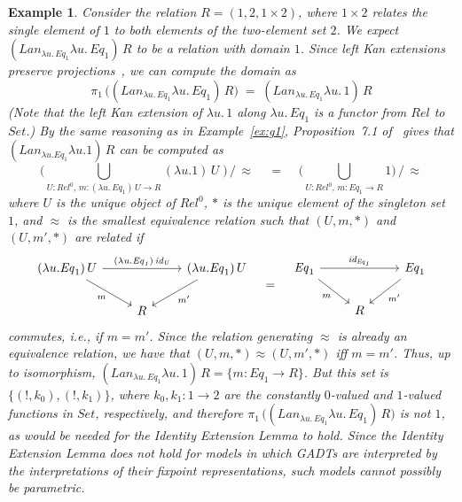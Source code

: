 \documentclass[submission,copyright,creativecommons]{eptcs}
\newtheorem{example}[thm]{Example}
\begin{document}
\begin{example}
Consider the relation $R = (1, 2, 1 \times 2)$, where $1 \times 2$
relates the single element of $1$ to both elements of the two-element
set $2$. We expect $(\mathit{Lan}_{\lambda u\!.\,\mathit{Eq}_1}
\lambda u\!.\,\mathit{Eq}_1)\, R$ to be a relation with domain
$1$. Since left Kan extensions preserve projections~\cite{rie16}, we
can compute the domain as
\[\pi_1\,\big( (\mathit{Lan}_{\lambda u\!.\,\mathit{Eq}_1} \lambda
u\!.\,\mathit{Eq}_1) \, R \big)\;=\; (\mathit{Lan}_{\lambda
  u\!.\,\mathit{Eq}_1} \lambda u\!. \,1)\, R\] (Note that the left Kan
extension of $\lambda u\!. \,1$ along $\lambda u\!.\,\mathit{Eq}_1$ is
a functor from $\mathit{Rel}$ to $\mathit{Set}$.)  By the same
reasoning as in Example~\ref{ex:g1}, Proposition~7.1 of~\cite{blw03}
gives that $(\mathit{Lan}_{\lambda u. \mathit{Eq}_1} \lambda u. 1)\,R$
can be computed as
\[\big( \bigcup_{U : \mathit{Rel}^0,\,m: (\lambda u.\,\mathit{Eq}_1)\,U \to R} (\lambda
u. 1)\,U \;\big) \,/\,\approx \;\;\;\;=\;\;\;\; \big( \bigcup_{U :
  \mathit{Rel}^0,\,m: \mathit{Eq}_1 \to R} 1 \big)\,/\,\approx\] where
$U$ is the unique object of $\mathit{Rel}^0$, $*$ is the unique
element of the singleton set $1$, and $\approx$ is the smallest
equivalence relation such that $(U,m,*)$ and $(U,m',*)$ are related if
\[
\begin{tikzcd}
(\lambda u.\mathit{Eq}_1)\,U \ar[rr, "{\mathit{(\lambda
        u.\mathit{Eq}_1)\,id_U}}"] \ar[dr, "m"'] 
&& (\lambda u. \mathit{Eq}_1)\,U \ar[dl, "m'"] \\
&R
\end{tikzcd} \;\;\; =\;\;\;
\begin{tikzcd}
\mathit{Eq}_1 \ar[rr, "{\mathit{id_{\mathit{Eq}_1}}}"] \ar[dr, "m"']
&&\mathit{Eq}_1 \ar[dl, "m'"] \\
&R
\end{tikzcd}
\]
commutes, i.e., if $m = m'$. Since the relation generating $\approx$
is already an equivalence relation, we have that $(U,m,*) \approx
(U,m', *)$ iff $m = m'$. Thus, up to isomorphism,
$(\mathit{Lan}_{\lambda u\!.\,\mathit{Eq}_1} \lambda u\!. \,1)\, R =
\{ m : \mathit{Eq}_1 \to R\}$.  But this set is $\{(!, k_0), (!,
k_1)\}$, where $k_0, k_1 : 1 \to 2$ are the constantly $0$-valued and
$1$-valued functions in $\mathit{Set}$, respectively, and therefore
$\pi_1\,\big( (\mathit{Lan}_{\lambda u\!.\,\mathit{Eq}_1} \lambda
u\!.\,\mathit{Eq}_1) \, R \big)$ is not $1$, as would be needed for
the Identity Extension Lemma to hold.  Since the Identity Extension
Lemma does not hold for models in which GADTs are interpreted by the
interpretations of their fixpoint representations, such models cannot
possibly be parametric.
\end{example}
\end{document}
